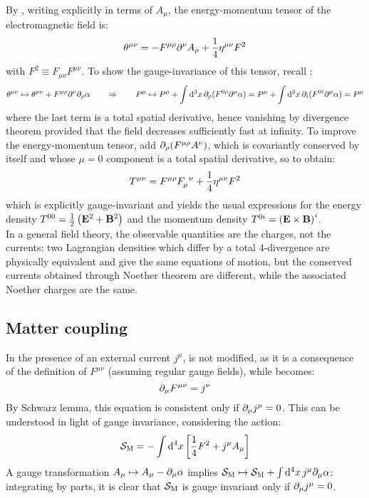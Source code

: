 By , writing  explicitly in terms of $ A_\mu $, the energy-momentum tensor of the electromagnetic field is:
\begin{equation}
  \theta^{\mu \nu} = - F^{\mu \rho} \partial^\nu A_\rho + \frac{1}{4} \eta^{\mu \nu} F^2
\end{equation}
with $ F^2 \equiv F_{\mu \nu} F^{\mu \nu} $. To show the gauge-invariance of this tensor, recall :
\begin{equation*}
  \theta^{\mu \nu} \mapsto \theta^{\mu \nu} + F^{\mu \rho} \partial^\nu \partial_\rho \alpha
  \qquad \Rightarrow \qquad
  P^\mu \mapsto P^\mu + \int \mathrm{d}^3x\, \partial_\rho (F^{0 \rho} \partial^\mu \alpha) = P^\mu + \int \mathrm{d}^3x\, \partial_i (F^{0i} \partial^\mu \alpha) = P^\mu
\end{equation*}
where the last term is a total spatial derivative, hence vanishing by divergence theorem provided that the field decreases sufficiently fast at infinity. To improve the energy-momentum tensor, add $ \partial_\rho (F^{\mu \rho} A^\nu) $, which is covariantly conserved by itself and whose $ \mu = 0 $ component is a total spatial derivative, so to obtain:
\begin{equation}
  T^{\mu \nu} = F^{\mu \rho} \tensor{F}{_\rho^\nu} + \frac{1}{4} \eta^{\mu \nu} F^2
\end{equation}
which is explicitly gauge-invariant and yields the usual expressions for the energy density $ T^{00} = \frac{1}{2} \left( \mathbf{E}^2 + \mathbf{B}^2 \right) $ and the momentum density $ T^{0i} = \left( \mathbf{E} \times \mathbf{B} \right)^i $.\\
In a general field theory, the observable quantities are the charges, not the currents: two Lagrangian densities which differ by a total 4-divergence are physically equivalent and give the same equations of motion, but the conserved currents obtained through Noether theorem are different, while the associated Noether charges are the same.

\subsection{Matter coupling}

In the presence of an external current $ j^\mu $,  is not modified, as it is a consequence of the definition of $ F^{\mu \nu} $ (assuming regular gauge fields), while  becomes:
\begin{equation}
  \partial_\mu F^{\mu \nu} = j^\nu
  \label{eq:maxw-3}
\end{equation}
By Schwarz lemma, this equation is consistent only if $ \partial_\mu j^\mu = 0 $. This can be understood in light of gauge invariance, considering the action:
\begin{equation}
  \mathcal{S}_\text{M} = - \int \mathrm{d}^4x \left[ \frac{1}{4} F^2 + j^\mu A_\mu \right]
\end{equation}
A gauge transformation $ A_\mu \mapsto A_\mu - \partial_\mu \alpha $ implies $ \mathcal{S}_\text{M} \mapsto \mathcal{S}_\text{M} + \int \mathrm{d}^4x\, j^\mu \partial_\mu \alpha $: integrating by parts, it is clear that $ \mathcal{S}_\text{M} $ is gauge invariant only if $ \partial_\mu j^\mu = 0 $.

